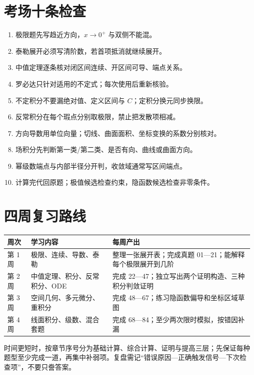 \section{考场十条检查}
\begin{enumerate}
\item 极限题先写趋近方向，$x\to0^+$ 与双侧不能混。
\item 泰勒展开必须写清阶数，若首项抵消就继续展开。
\item 中值定理逐条核对闭区间连续、开区间可导、端点关系。
\item 罗必达只针对适用的不定式；每次使用后重新核验。
\item 不定积分不要漏绝对值、定义区间与 $C$；定积分换元同步换限。
\item 反常积分在每个瑕点分别取极限，禁止把发散项相减。
\item 方向导数用单位向量；切线、曲面面积、坐标变换的系数分别核对。
\item 场积分先判断第一类/第二类、是否有向、曲线或曲面方向。
\item 幂级数端点与内部半径分开判，收敛域通常写区间端点。
\item 计算完代回原题；极值候选检查约束，隐函数候选检查非零条件。
\end{enumerate}

\section{四周复习路线}
\begin{longtable}{p{}p{}p{}}
\toprule 周次 & 学习内容 & 每周产出\\\midrule\endhead
第 1 周 & 极限、连续、导数、泰勒 & 整理一张展开表；完成真题 01—21；能解释每个极限展开到几阶\\
第 2 周 & 中值定理、积分、反常积分、ODE & 完成 22—47；独立写出两个证明构造、三种积分判敛证明\\
第 3 周 & 空间几何、多元微分、重积分 & 完成 48—67；练习隐函数偏导和坐标区域草图\\
第 4 周 & 线面积分、级数、混合套题 & 完成 68—84；至少两次限时模拟，按错因补漏\\
\bottomrule
\end{longtable}
时间更短时，按章节序号分为基础计算、综合计算、证明与提高三层；先保证每种题型至少完成一道，再集中补弱项。复盘需记“错误原因—正确触发信号—下次检查项”，不要只誊答案。

